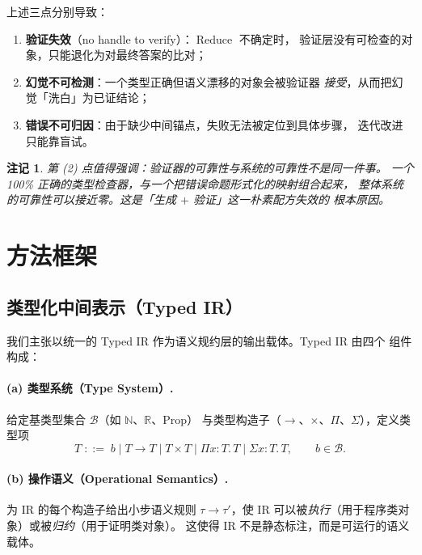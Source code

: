 \documentclass[UTF8,a4paper,11pt]{ctexart}
\newtheorem{remark}{注记}[section]
\DeclareMathOperator{\Reduce}{Reduce}
\begin{document}
上述三点分别导致：
\begin{enumerate}[leftmargin=1.6em,itemsep=2pt]
  \item \textbf{验证失效}（no handle to verify）：$\Reduce$ 不确定时，
        验证层没有可检查的对象，只能退化为对最终答案的比对；
  \item \textbf{幻觉不可检测}：一个类型正确但语义漂移的对象会被验证器
        \emph{接受}，从而把幻觉「洗白」为已证结论；
  \item \textbf{错误不可归因}：由于缺少中间锚点，失败无法被定位到具体步骤，
        迭代改进只能靠盲试。
\end{enumerate}

\begin{remark}
第 (2) 点值得强调：\emph{验证器的可靠性与系统的可靠性不是同一件事}。
一个 100\% 正确的类型检查器，与一个把错误命题形式化的映射组合起来，
整体系统的可靠性可以接近零。这是「生成 $+$ 验证」这一朴素配方失效的
根本原因。
\end{remark}

\section{方法框架}\label{sec:framework}

\subsection{类型化中间表示（Typed IR）}

我们主张以统一的 Typed IR 作为语义规约层的输出载体。Typed IR 由四个
组件构成：

\paragraph{(a) 类型系统（Type System）.}
给定基类型集合 $\mathcal{B}$（如 $\mathbb{N}$、$\mathbb{R}$、$\mathrm{Prop}$）
与类型构造子（$\to$、$\times$、$\Pi$、$\Sigma$），定义类型项
\begin{equation}\label{eq:type}
  T \;::=\; b \mid T \to T \mid T \times T \mid \Pi x{:}T.\,T \mid \Sigma x{:}T.\,T,
  \qquad b \in \mathcal{B}.
\end{equation}

\paragraph{(b) 操作语义（Operational Semantics）.}
为 IR 的每个构造子给出小步语义规则 $\tau \longrightarrow \tau'$，使 IR
可以被\emph{执行}（用于程序类对象）或被\emph{归约}（用于证明类对象）。
这使得 IR 不是静态标注，而是可运行的语义载体。
\end{document}
